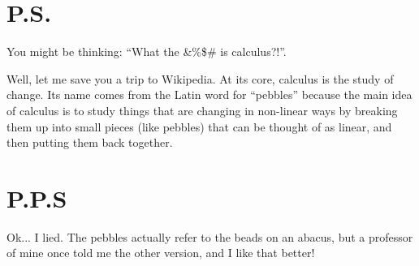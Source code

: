 \section*{P.S.}
You might be thinking: ``What the \&\%\$\# is calculus?!''.

Well, let me save you a trip to Wikipedia. At its core, calculus is the study of change. Its name comes from the Latin word for ``pebbles'' because the main idea of calculus is to study things that are changing in non-linear ways by breaking them up into small pieces (like pebbles) that can be thought of as linear, and then putting them back together.

\section*{P.P.S}
Ok... I lied. The pebbles actually refer to the beads on an abacus, but a professor of mine once told me the other version, and I like that better!
